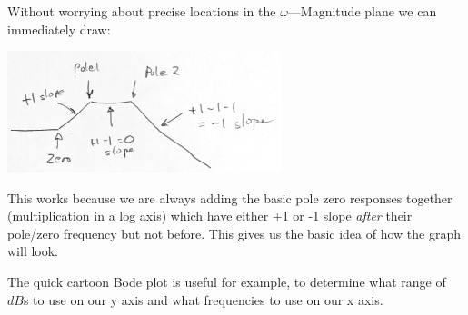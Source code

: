 Without worrying about precise locations in the $\omega$---Magnitude plane we can immediately
draw:

\includegraphics[width=80mm]{figs05/Q47M85.png}

This works because we are always adding the basic pole zero responses together (multiplication
 in a log axis) which have either
+1 or -1 slope {\it after} their pole/zero frequency but not before.
This gives us the basic idea of how the graph will look.

The quick cartoon Bode plot is useful for example, to
determine what range of $dB$s to use on our y axis and what frequencies to use on our x axis.


